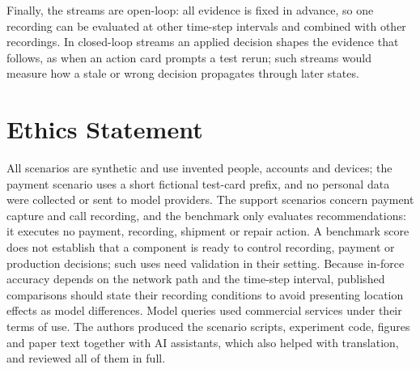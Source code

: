 \documentclass[11pt]{article}
\begin{document}
Finally, the streams are open-loop: all evidence is fixed in advance, so one recording can be evaluated at other time-step intervals and combined with other recordings.
In closed-loop streams an applied decision shapes the evidence that follows, as when an action card prompts a test rerun; such streams would measure how a stale or wrong decision propagates through later states.

\section*{Ethics Statement}
All scenarios are synthetic and use invented people, accounts and devices; the payment scenario uses a short fictional test-card prefix, and no personal data were collected or sent to model providers.
The support scenarios concern payment capture and call recording, and the benchmark only evaluates recommendations: it executes no payment, recording, shipment or repair action.
A benchmark score does not establish that a component is ready to control recording, payment or production decisions; such uses need validation in their setting.
Because in-force accuracy depends on the network path and the time-step interval, published comparisons should state their recording conditions to avoid presenting location effects as model differences.
Model queries used commercial services under their terms of use.
The authors produced the scenario scripts, experiment code, figures and paper text together with AI assistants, which also helped with translation, and reviewed all of them in full.



\clearpage
\appendix

\end{document}

